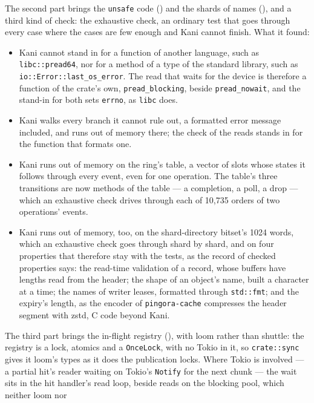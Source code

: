 The second part brings the \texttt{unsafe} code
() and the shards of names
(), and a third kind of check: the exhaustive
check, an ordinary test that goes through every case where the cases are
few enough and Kani cannot finish. What it found:
\begin{itemize}
  \item Kani cannot stand in for a function of another language, such as
    \texttt{libc::pread64}, nor for a method of a type of the standard
    library, such as \texttt{io::Error::last\_os\_error}. The read that waits
    for the device is therefore a function of the crate's own,
    \texttt{pread\_blocking}, beside \texttt{pread\_nowait}, and the stand-in
    for both sets \texttt{errno}, as \texttt{libc} does.
  \item Kani walks every branch it cannot rule out, a formatted error
    message included, and runs out of memory there; the check of the reads
    stands in for the function that formats one.
  \item Kani runs out of memory on the ring's table, a vector of slots
    whose states it follows through every event, even for one operation. The
    table's three transitions are now methods of the table --- a completion,
    a poll, a drop --- which an exhaustive check drives through each of
    10,735 orders of two operations' events.
  \item Kani runs out of memory, too, on the shard-directory bitset's 1024
    words, which an exhaustive check goes through shard by shard, and on
    four properties that therefore stay with the tests, as the record of
    checked properties says: the read-time validation of a record, whose
    buffers have lengths read from the header; the shape of an object's
    name, built a character at a time; the names of writer leases,
    formatted through \texttt{std::fmt}; and the expiry's length, as the
    encoder of \texttt{pingora-cache} compresses the header segment with
    zstd, C code beyond Kani.
\end{itemize}
The third part brings the in-flight registry
(), with loom rather than shuttle: the
registry is a lock, atomics and a \texttt{OnceLock}, with no Tokio in it, so
\texttt{crate::sync} gives it loom's types as it does the publication locks.
Where Tokio is involved --- a partial hit's reader waiting on Tokio's
\texttt{Notify} for the next chunk --- the wait sits in the hit handler's
read loop, beside reads on the blocking pool, which neither loom nor
